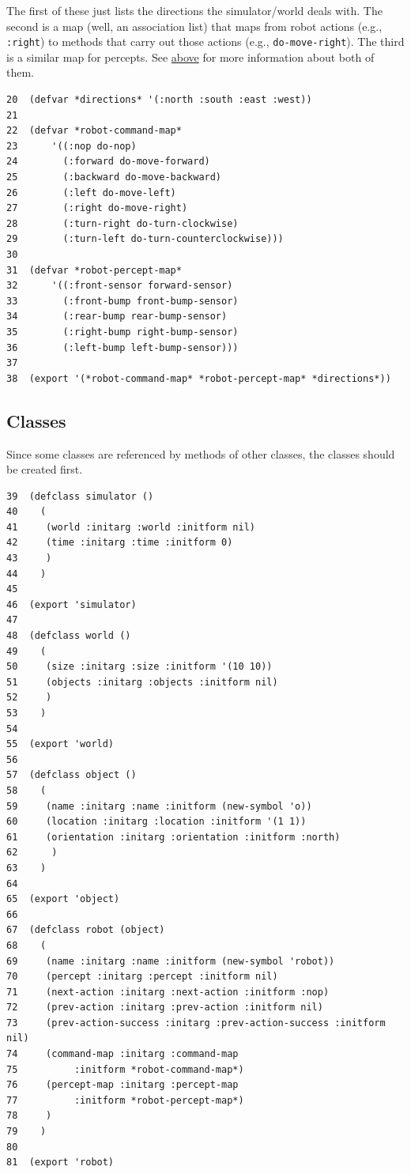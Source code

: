 \documentclass[11pt]{tufte-handout}
\begin{document}
The first of these just lists the directions the simulator/world deals with.  The second is a map (well, an association list) that maps from robot actions (e.g., \texttt{:right}) to methods that carry out those actions (e.g., \texttt{do-move-right}).  The third is a similar map for percepts.  See \hyperref[orge6509b9]{above} for more information about both of them.

\begin{verbatim}
20  (defvar *directions* '(:north :south :east :west))
21  
22  (defvar *robot-command-map*
23      '((:nop do-nop)
24        (:forward do-move-forward)
25        (:backward do-move-backward)
26        (:left do-move-left)
27        (:right do-move-right)
28        (:turn-right do-turn-clockwise)
29        (:turn-left do-turn-counterclockwise)))
30  
31  (defvar *robot-percept-map*
32      '((:front-sensor forward-sensor)
33        (:front-bump front-bump-sensor)
34        (:rear-bump rear-bump-sensor)
35        (:right-bump right-bump-sensor)      
36        (:left-bump left-bump-sensor)))
37  
38  (export '(*robot-command-map* *robot-percept-map* *directions*))
\end{verbatim}

\subsection{Classes}
\label{sec:org30d7381}

Since some classes are referenced by methods of other classes, the classes should be created first.

\begin{verbatim}
39  (defclass simulator ()
40    (
41     (world :initarg :world :initform nil)
42     (time :initarg :time :initform 0)
43     )
44    )
45  
46  (export 'simulator)
47  
48  (defclass world ()
49    (
50     (size :initarg :size :initform '(10 10))
51     (objects :initarg :objects :initform nil)
52     )
53    )
54  
55  (export 'world)
56  
57  (defclass object ()
58    (
59     (name :initarg :name :initform (new-symbol 'o))
60     (location :initarg :location :initform '(1 1))
61     (orientation :initarg :orientation :initform :north)
62      )
63    )
64  
65  (export 'object)
66  
67  (defclass robot (object)
68    (
69     (name :initarg :name :initform (new-symbol 'robot))
70     (percept :initarg :percept :initform nil)
71     (next-action :initarg :next-action :initform :nop)
72     (prev-action :initarg :prev-action :initform nil)
73     (prev-action-success :initarg :prev-action-success :initform nil)
74     (command-map :initarg :command-map
75  		:initform *robot-command-map*)
76     (percept-map :initarg :percept-map
77  		:initform *robot-percept-map*)
78     )
79    )
80  
81  (export 'robot)
\end{verbatim}
\end{document}

